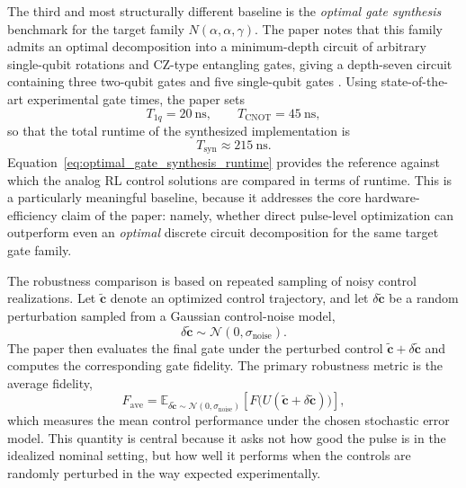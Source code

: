 The third and most structurally different baseline is the \emph{optimal gate synthesis} benchmark for the target family \(N(\alpha,\alpha,\gamma)\). The paper notes that this family admits an optimal decomposition into a minimum-depth circuit of arbitrary single-qubit rotations and CZ-type entangling gates, giving a depth-seven circuit containing three two-qubit gates and five single-qubit gates \cite{Niu2019}. Using state-of-the-art experimental gate times, the paper sets
\begin{equation}
T_{1q} = 20~\mathrm{ns},
\qquad
T_{\mathrm{CNOT}} = 45~\mathrm{ns},
\label{eq:baseline_gate_times}
\end{equation}
so that the total runtime of the synthesized implementation is
\begin{equation}
T_{\mathrm{syn}} \approx 215~\mathrm{ns}.
\label{eq:optimal_gate_synthesis_runtime}
\end{equation}
Equation~\eqref{eq:optimal_gate_synthesis_runtime} provides the reference against which the analog RL control solutions are compared in terms of runtime. This is a particularly meaningful baseline, because it addresses the core hardware-efficiency claim of the paper: namely, whether direct pulse-level optimization can outperform even an \emph{optimal} discrete circuit decomposition for the same target gate family.

The robustness comparison is based on repeated sampling of noisy control realizations. Let \(\tilde{\bm{c}}\) denote an optimized control trajectory, and let \(\delta \tilde{\bm{c}}\) be a random perturbation sampled from a Gaussian control-noise model,
\begin{equation}
\delta \tilde{\bm{c}} \sim \mathcal{N}(0,\sigma_{\mathrm{noise}}).
\label{eq:gaussian_noise_model_baseline_section}
\end{equation}
The paper then evaluates the final gate under the perturbed control \(\tilde{\bm{c}}+\delta \tilde{\bm{c}}\) and computes the corresponding gate fidelity. The primary robustness metric is the average fidelity,
\begin{equation}
F_{\mathrm{ave}}
=
\mathbb{E}_{\delta \tilde{\bm{c}} \sim \mathcal{N}(0,\sigma_{\mathrm{noise}})}
\left[
F\bigl(U(\tilde{\bm{c}}+\delta \tilde{\bm{c}})\bigr)
\right],
\label{eq:paper_average_fidelity_metric}
\end{equation}
which measures the mean control performance under the chosen stochastic error model. This quantity is central because it asks not how good the pulse is in the idealized nominal setting, but how well it performs when the controls are randomly perturbed in the way expected experimentally.

